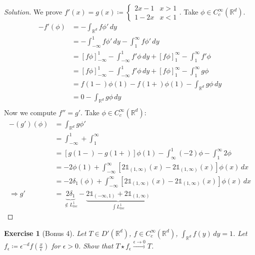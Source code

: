 \documentclass{report}
\theoremstyle{tommy}
\newtheorem{ex}[defn]{Exercise}
\begin{document}
  \begin{proof}[Solution]
    We prove \(f'(x) = g(x) \coloneqq \begin{cases}
      2x - 1 & x > 1 \\  1- 2x & x < 1
    \end{cases}\). Take \(\phi \in C_c^\infty(\mathbb{R}^d)\).
    \begin{align*}
      -f'(\phi) 
      &= - \int_{\mathbb{R}^d} f \phi' \, dy \\
      &= - \int_{-\infty}^1 f \phi' \, dy - \int_1^\infty f \phi' \, dy  \\
      &= [f \phi]_{- \infty}^1 - \int_{- \infty}^1 f' \phi \, dy + [f \phi]_1^\infty - \int_1^\infty f' \phi \\
      &= [f \phi]_{- \infty}^1 - \int_{- \infty}^1 f' \phi \, dy + [f \phi]_1^\infty - \int_1^\infty g \phi \\
      &= f(1-) \phi(1) - f(1+)\phi(1) - \int_{\mathbb{R}^d} g \phi \, dy \\
      &= 0  - \int_{\mathbb{R}^d} g \phi \, dy \\
    \end{align*}
    Now we compute \(f'' = g'\). Take \(\phi \in C_c^\infty(\mathbb{R}^d)\):
    \begin{align*}
      -(g')(\phi) 
      &= \int_{\mathbb{R}^d} g\phi' \\
      &= \int_{- \infty}^1 + \int_1^\infty  \\
      &= [g(1-) - g(1+)] \phi(1) - \int_{\infty}^1(-2) \phi - \int_1^\infty 2 \phi \\
      &= - 2 \phi(1) + \int_{-\infty}^\infty [2 \mathbb{1}_{(1, \infty)}(x) - 2 \mathbb{1}_{(1,  \infty)} (x)]\phi(x) \, dx \\
      &= -2 \delta_1(\phi) + \int_{-\infty}^\infty [2 \mathbb{1}_{(1, \infty)}(x) - 2 \mathbb{1}_{(1,  \infty)} (x)]\phi(x) \, dx \\
      \Rightarrow g' &= \underbrace{2 \delta_1}_{\notin L_{loc}^1} - \underbrace{2 \mathbb{1}_{(-\infty, 1)} + 2 \mathbb{1}_{(1, \infty)}}_{\int L_{loc}^1}
    \end{align*}
  \end{proof}

  \begin{ex}[Bonus 4]
    Let \(T \in D'(\mathbb{R}^d)\), \(f \in C_c^\infty(\mathbb{R}^d)\), \(\int_{\mathbb{R}^d} f(y) \, dy = 1\). Let \(f_\epsilon \coloneqq \epsilon^{-d} f\left(\frac{x}{\epsilon}\right)\) for \(\epsilon > 0\). Show that \(T \star f_\epsilon \xrightarrow{\epsilon \to 0} T\).
  \end{ex}
\end{document}
